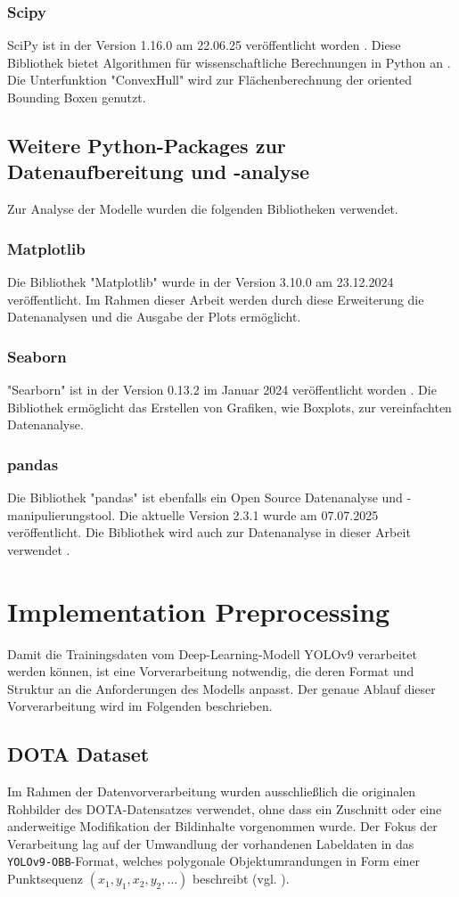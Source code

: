 \subsubsection{Scipy}
SciPy ist in der Version 1.16.0 am 22.06.25 veröffentlicht worden \cite{scipy-main}. Diese Bibliothek bietet Algorithmen für wissenschaftliche Berechnungen in Python an \cite{scipy-main}. Die Unterfunktion "ConvexHull" wird zur Flächenberechnung der oriented Bounding Boxen genutzt.
\subsection{Weitere Python-Packages zur Datenaufbereitung und -analyse}
Zur Analyse der Modelle wurden die folgenden Bibliotheken verwendet.
\subsubsection*{Matplotlib}
Die Bibliothek "Matplotlib" wurde in der Version 3.10.0 am 23.12.2024 veröffentlicht\cite{matplotlib}. Im Rahmen dieser Arbeit werden durch diese Erweiterung die Datenanalysen und die Ausgabe der Plots ermöglicht.
\subsubsection*{Seaborn}
"Searborn" ist in der Version 0.13.2 im Januar 2024 veröffentlicht worden \cite{seaborn}. Die Bibliothek ermöglicht das Erstellen von Grafiken, wie Boxplots, zur vereinfachten Datenanalyse.
\subsubsection*{pandas}
Die Bibliothek "pandas" ist ebenfalls ein Open Source Datenanalyse und -manipulierungstool. Die aktuelle Version 2.3.1 wurde am 07.07.2025 veröffentlicht. Die Bibliothek wird auch zur Datenanalyse in dieser Arbeit verwendet \cite{pandas}.

\section{Implementation Preprocessing}
Damit die Trainingsdaten vom Deep-Learning-Modell YOLOv9 verarbeitet werden können, ist eine Vorverarbeitung notwendig, die deren Format und Struktur an die Anforderungen des Modells anpasst. Der genaue Ablauf dieser Vorverarbeitung wird im Folgenden beschrieben.
\subsection{DOTA Dataset}
Im Rahmen der Datenvorverarbeitung wurden ausschließlich die originalen Rohbilder des \acrshort{DOTA}-Datensatzes verwendet, ohne dass ein Zuschnitt oder eine anderweitige Modifikation der Bildinhalte vorgenommen wurde. Der Fokus der Verarbeitung lag auf der Umwandlung der vorhandenen Labeldaten in das \texttt{YOLOv9-OBB}-Format, welches polygonale Objektumrandungen in Form einer Punktsequenz \((x_1, y_1, x_2, y_2, \ldots)\) beschreibt (vgl. ).

